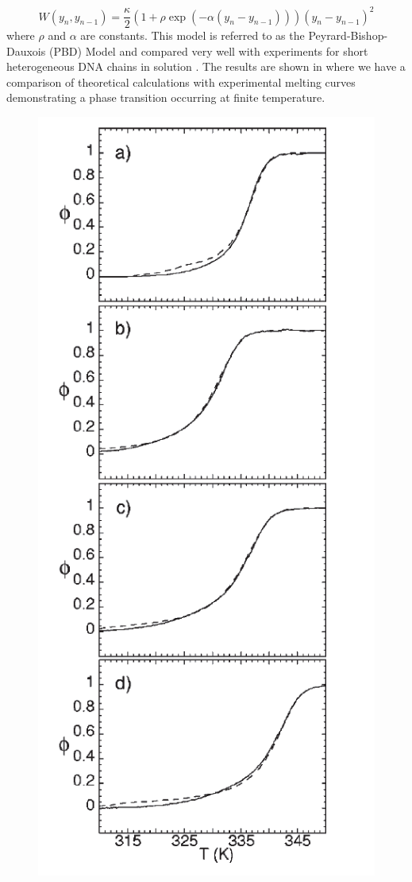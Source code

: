 %
\begin{equation}
W\left(y_{n},y_{n-1}\right)=\frac{\kappa}{2}\left(1+\rho\exp\left(-\alpha\left(y_{n}-y_{n-1}\right)\right)\right)\left(y_{n}-y_{n-1}\right)^{2}
\label{pbd_stacking_pe}
\end{equation}
%
where $\rho$ and $\alpha$ are constants. This model is referred to as the Peyrard-Bishop-Dauxois (PBD) Model and compared very well with experiments for short heterogeneous DNA chains in solution \cite{Campa1998}. The results are shown in  where we have a comparison of theoretical calculations with experimental melting curves demonstrating a phase transition occurring at finite temperature.
%
\begin{figure}[H]
\centering \includegraphics[scale=0.42]{Graphics/DNA/exp.png}

\end{figure}
